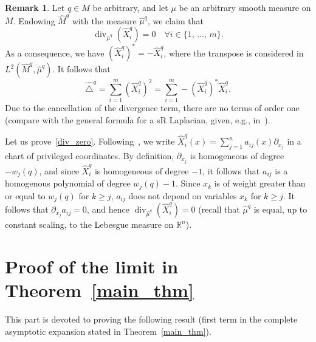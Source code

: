 \documentclass[10pt]{amsart}
\theoremstyle{definition}\newtheorem{defi}[theo]{Definition}\newtheorem{rema}[theo]{Remark}\newtheorem{exam}[theo]{Example}\newtheorem{exem}[theo]{Example}\newtheorem{nota}[theo]{Notation}
\newcommand*\R{\mathbb{R}}
\DeclareMathOperator{\divl}{div}
\renewcommand{\geq}{\geqslant}
\let\oldforall\forall
\renewcommand*{\forall}{\mathrel{\oldforall}}
\begin{document}
\begin{rema}\label{rem_nilpLap}
Let $q\in M$ be arbitrary, and let $\mu$ be an arbitrary smooth measure on $M$. Endowing $\widehat{M}^{q}$ with the measure $\widehat{\mu}^{q}$, we claim that
\begin{equation}\label{div_zero}
\divl_{\widehat{\mu}^{q}}\left(\widehat{X}^{q}_i\right)=0 \quad \forall i\in\{1,\,\ldots,\,m\}.
\end{equation}
As a consequence, we have $(\widehat{X}^{q}_i)^*=-\widehat{X}^{q}_i$, where the transpose is considered in $L^2(\widehat{M}^{q},\widehat{\mu}^{q})$. It follows that
\[
\widehat{\triangle}^{q} = \sum_{i=1}^m \left(\widehat{X}^{q}_i\right)^2 = \sum_{i=1}^m - \left(\widehat{X}^{q}_i\right)^*\widehat{X}^{q}_i.
\]
Due to the cancellation of the divergence term, there are no terms of order one (compare with the general formula for a sR Laplacian, given, e.g., in~\cite{CHT-SEDP}).

Let us prove~\eqref{div_zero}. Following~\cite[page 25]{Jean_2014}, we write $\widehat{X}^{q}_i(x) = \sum_{j=1}^n a_{ij}(x)\partial_{x_j}$ in a chart of privileged coordinates. By definition, $\partial_{x_j}$ is homogeneous of degree $-w_j(q)$, and since $\widehat{X}^{q}_i$ is homogeneous of degree $-1$, it follows that $a_{ij}$ is a homogenous polynomial of degree $w_j(q)-1$. Since $x_k$ is of weight greater than or equal to $w_j(q)$ for $k\geq j$, $a_{ij}$ does not depend on variables $x_k$ for $k\geq j$. It follows that $\partial_{x_j}a_{ij}=0$, and hence $\divl_{\widehat{\mu}^{q}}(\widehat{X}^{q}_i)=0$ (recall that $\widehat{\mu}^{q}$ is equal, up to constant scaling, to the Lebesgue measure on $\R^n$).
\end{rema}

\goodbreak
{\Large
\part{Proof of the limit in Theorem~\ref{main_thm}}\label{part_limit}
}


This part is devoted to proving the following result (first term in the complete asymptotic expansion stated in Theorem~\ref{main_thm}).
\end{document}
